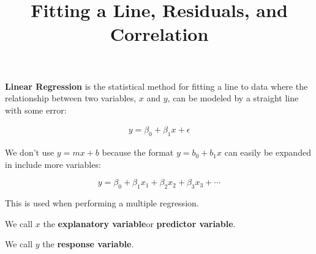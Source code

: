 \documentclass{beamer}
\title[MA205 - Section 8.1]{Fitting a Line, Residuals, and Correlation}
\begin{document}
\begin{frame}
  \titlepage
\end{frame}

\begin{frame}
  \begin{definition}
    \textbf{Linear Regression} is the statistical method for fitting a line to data where the relationship between two variables, $x$ and $y$, can be modeled by a straight line with some error:

    \vspace{-4mm}
    \begin{equation*}
      \begin{aligned}
        y = \beta_0 + \beta_1 x + \epsilon
      \end{aligned}
    \end{equation*}
  \end{definition}\pause

  \begin{note}
    We don't use $y=mx+b$ because the format $y=b_0+b_1 x$ can easily be expanded in include more variables:

    \vspace{-4mm}
    \begin{equation*}
      y=\beta_0+\beta_1 x_1 + \beta_2 x_2 + \beta_3 x_3 + \cdots
    \end{equation*}

    \vspace{-2mm}
    This is used when performing a multiple regression.
  \end{note}\pause

  \begin{definition}
    We call $x$ the \textbf{explanatory variable}or  \textbf{predictor variable}.
  \end{definition}\pause

  \begin{definition}
    We call $y$ the \textbf{response variable}.
  \end{definition}
\end{frame}
\end{document}
